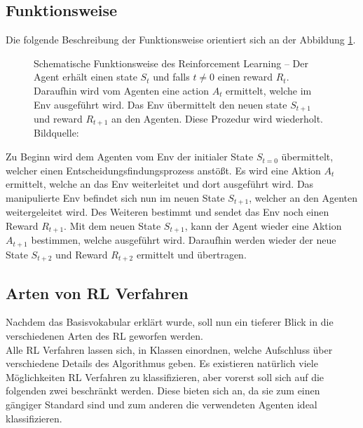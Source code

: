 \subsection{Funktionsweise} \label{subsec:Grundlagen_Funktionsweise}
Die folgende Beschreibung der Funktionsweise orientiert sich an der Abbildung \ref{fig:Grundlagen_Reinforcement_Learning}.
\begin{figure}[H]
	\centering
	
	\caption[Reinforcement Learning]{Schematische Funktionsweise des Reinforcement Learning -- Der Agent erhält einen state $S_{t}$ und falls 
		$t \neq 0$ einen reward $R_{t}$. Daraufhin wird vom Agenten eine action $A_{t}$ ermittelt, welche im Env ausgeführt wird. Das Env übermittelt den neuen state $S_{t+1}$ und reward $R_{t+1}$ an den Agenten. Diese Prozedur wird wiederholt. Bildquelle: \citep[S. 38]{Sutton1998}}
	\label{fig:Grundlagen_Reinforcement_Learning}
\end{figure}
Zu Beginn wird dem Agenten vom Env der initialer State $S_{t=0}$ übermittelt, welcher einen Entscheidungsfindungsprozess anstößt. Es wird eine Aktion $A_{t}$ ermittelt, welche an das Env weiterleitet und dort ausgeführt wird.
Das manipulierte Env befindet sich nun im neuen State $S_{t+1}$, welcher an den Agenten weitergeleitet wird. Des Weiteren bestimmt und sendet das Env noch einen Reward $R_{t+1}$.
Mit dem neuen State $S_{t+1}$, kann der Agent wieder eine Aktion $A_{t+1}$ bestimmen, welche ausgeführt wird. Daraufhin werden wieder der neue State $S_{t+2}$ und Reward $R_{t+2}$ ermittelt und übertragen. \citep[S. 37 ff.]{Sutton1998}

\subsection{Arten von RL Verfahren} \label{subsec:Grundlagen_Arten_RL_Verfahren}
Nachdem das Basisvokabular erklärt wurde, soll nun ein tieferer Blick in die verschiedenen Arten des RL geworfen werden.\\
Alle RL Verfahren lassen sich, in Klassen einordnen, welche Aufschluss über verschiedene Details des Algorithmus geben. Es existieren natürlich viele Möglichkeiten RL Verfahren zu klassifizieren, aber vorerst soll sich auf die folgenden zwei beschränkt werden. Diese bieten sich an, da sie zum einen gängiger Standard sind und zum anderen die verwendeten Agenten ideal klassifizieren.

